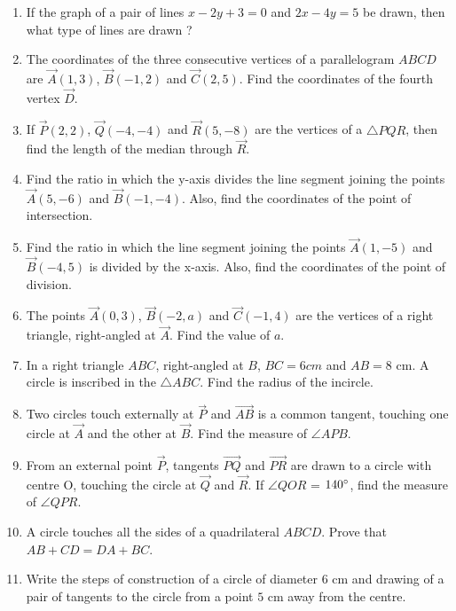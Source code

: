 \documentclass{article}
\begin{document}
\begin{enumerate}
\item If the graph of a pair of lines $x - 2y + 3 = 0$ and $2x - 4y = 5$ be drawn, then what type of lines are drawn ? 
  
\item The coordinates of the three consecutive vertices of a parallelogram $ABCD$ are $\vec{A}(1, 3)$, $\vec{B}(-1, 2)$ and $\vec{C}(2, 5)$. Find the coordinates of the fourth vertex $\vec{D}$. 

\item If $\vec{P}(2, 2)$, $\vec{Q}(-4, -4)$ and $\vec{R}(5, -8)$ are the vertices of a $\triangle PQR$, then find the length of the median through $\vec{R}$.

\item Find the ratio in which the y-axis divides the line segment joining the points $\vec{A}(5, -6)$ and $\vec{B}(-1, -4)$. Also, find the coordinates of the point of intersection.

\item Find the ratio in which the line segment joining the points $\vec{A}(1, -5)$ and $\vec{B}(-4, 5)$ is divided by the x-axis. Also, find the coordinates of the point of division.
   
\item The points $\vec{A}(0, 3)$, $\vec{B}(-2, a)$ and $\vec{C}(-1, 4)$ are the vertices of a right triangle, right-angled at $\vec{A}$. Find the value of $a$. 
		
\item In a right triangle $ABC$, right-angled at $B$, $BC = 6 cm$ and $AB = 8$ cm. A circle is inscribed in the $\triangle ABC$. Find the radius of the incircle. 
			
\item Two circles touch externally at $\vec{P}$ and $ \vec{AB} $ is a common tangent, touching one circle at $\vec{A}$ and the other at $\vec{B}$. Find the measure of $\angle APB$.

\item From an external point $\vec{P}$, tangents $\vec{PQ}$ and $\vec{PR}$ are drawn to a circle with centre O, touching the circle at $\vec{Q}$ and $\vec{R}$. If $\angle QOR$ = $140\degree$, find the measure of $\angle QPR$. 

\item A circle touches all the sides of a quadrilateral $ABCD$. Prove that $AB + CD = DA + BC$.

\item Write the steps of construction of a circle of diameter $6$ cm and drawing of a pair of tangents to the circle from a point $5$ cm away from the centre. 
		
\end{enumerate}	
\end{document}
